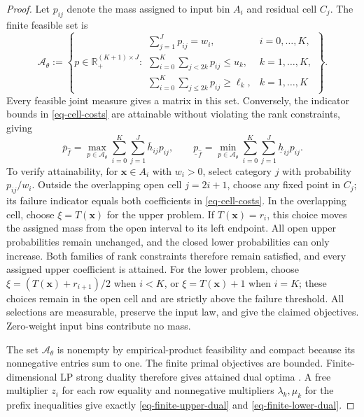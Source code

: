 \documentclass[review,11pt,3p,authoryear,nopreprintline]{elsarticle}
\begin{document}
\begin{proof}
  Let $p_{ij}$ denote the mass assigned to input bin $A_i$ and residual cell $C_j$. The finite feasible set is
  \begin{equation}
    \mathcal A_\theta:=\left\{p\in\mathbb R_+^{(K+1)\times J}:
    \begin{array}{ll}
      \displaystyle\sum_{j=1}^Jp_{ij}=w_i,&i=0,\ldots,K,\\[1mm]
      \displaystyle\sum_{i=0}^K\sum_{j<2k}p_{ij}\le u_k,&k=1,\ldots,K,\\[1mm]
      \displaystyle\sum_{i=0}^K\sum_{j\le2k}p_{ij}\ge\ell_k,&k=1,\ldots,K
    \end{array}\right\}.
    \label{eq-cell-mass-polytope}
  \end{equation}
  Every feasible joint measure gives a matrix in this set. Conversely, the indicator bounds in \eqref{eq-cell-costs} are attainable without violating the rank constraints, giving
  \begin{equation}
    \overline p_{\hat f}=\max_{p\in\mathcal A_\theta}\sum_{i=0}^K\sum_{j=1}^J\overline h_{ij}p_{ij},\qquad
    \underline p_{\hat f}=\min_{p\in\mathcal A_\theta}\sum_{i=0}^K\sum_{j=1}^J\underline h_{ij}p_{ij}.
    \label{eq-finite-primal-values}
  \end{equation}
  To verify attainability, for $\bm x\in A_i$ with $w_i>0$, select category $j$ with probability $p_{ij}/w_i$. Outside the overlapping open cell $j=2i+1$, choose any fixed point in $C_j$; its failure indicator equals both coefficients in \eqref{eq-cell-costs}. In the overlapping cell, choose $\xi=T(\bm x)$ for the upper problem. If $T(\bm x)=r_i$, this choice moves the assigned mass from the open interval to its left endpoint. All open upper probabilities remain unchanged, and the closed lower probabilities can only increase. Both families of rank constraints therefore remain satisfied, and every assigned upper coefficient is attained. For the lower problem, choose $\xi=(T(\bm x)+r_{i+1})/2$ when $i<K$, or $\xi=T(\bm x)+1$ when $i=K$; these choices remain in the open cell and are strictly above the failure threshold. All selections are measurable, preserve the input law, and give the claimed objectives. Zero-weight input bins contribute no mass.

  The set $\mathcal A_\theta$ is nonempty by empirical-product feasibility and compact because its nonnegative entries sum to one. The finite primal objectives are bounded. Finite-dimensional LP strong duality therefore gives attained dual optima \citep[Section~5.2.3]{B.V04}. A free multiplier $z_i$ for each row equality and nonnegative multipliers $\lambda_k,\mu_k$ for the prefix inequalities give exactly \eqref{eq-finite-upper-dual} and \eqref{eq-finite-lower-dual}.


\end{proof}
\end{document}
